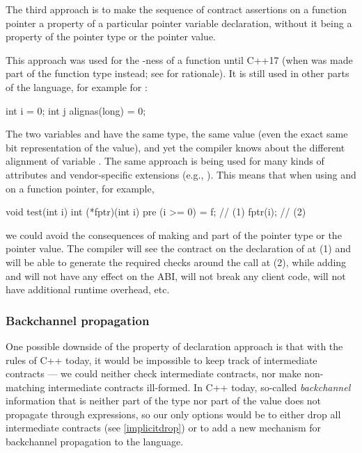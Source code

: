 The third approach is to make the sequence of contract assertions on a function pointer a property of a particular pointer variable declaration, without it being a property of the pointer type or the pointer value.

This approach was used for the -ness of a function until C++17 (when  was made part of the function type instead; see \cite{P0012R1} for rationale). It is still used in other parts of the language, for example for :
\begin{codeblock}
int i = 0;
int j alignas(long) = 0;
\end{codeblock}
The two variables  and  have the same type, the same value (even the exact same bit representation of the value), and yet the compiler knows about the different alignment of variable . The same approach is being used for many kinds of attributes and vendor-specific extensions (e.g., ). This means that when using   and  on a function pointer, for example,
\begin{codeblock}
void test(int i) {
  int (*fptr)(int i) pre (i >= 0) = f;  // (1)
  fptr(i);  // (2)
}
\end{codeblock}
we could avoid the consequences of making   and  part of the pointer type or the pointer value. The compiler will see the contract on the declaration of  at (1) and will be able to generate the required checks around the call at (2), while adding  and  will not have any effect on the ABI, will not break any client code, will not have additional runtime overhead, etc.

\subsubsection{Backchannel propagation}
\label{propagation}

One possible downside of the property of declaration approach is that with the rules of C++ today, it would be impossible to keep track of intermediate contracts --- we could neither check intermediate contracts, nor make non-matching intermediate contracts ill-formed. In C++ today, so-called \emph{backchannel} information that is neither part of the type nor part of the value does not propagate through expressions, so our only options would be to either drop all intermediate contracts (see \ref{implicitdrop}) or to add a new mechanism for backchannel propagation to the language.

